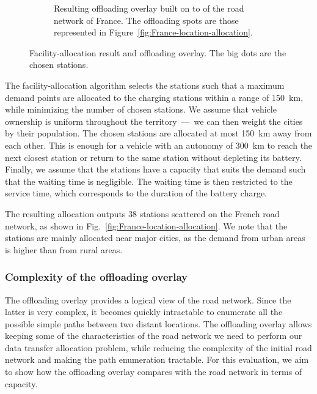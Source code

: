 \begin{figure}[ht]
\begin{subfigure}[t]{0.47\columnwidth}
            \caption{Resulting offloading overlay built on to of the road network of France. The offloading spots are those represented in Figure~\ref{fig:France-location-allocation}.}
            \label{fig:France-overlay-wo-capacity}
    \end{subfigure}
    \caption{Facility-allocation result and offloading overlay. The big dots are the chosen stations.}
\end{figure}

The facility-allocation algorithm selects the stations such that a maximum demand points are allocated to the charging stations within a range of 150~km, while minimizing the number of chosen stations. We assume that vehicle ownership is uniform throughout the territory~---~we can then weight the cities by their population. The chosen stations are allocated at most 150~km away from each other. This is enough for a vehicle with an autonomy of 300~km to reach the next closest station or return to the same station without depleting its battery. Finally, we assume that the stations have a capacity that suits the demand such that the waiting time is negligible. The waiting time is then restricted to the service time, which corresponds to the duration of the battery charge.

The resulting allocation outputs 38 stations scattered on the French road network, as shown in Fig.~\ref{fig:France-location-allocation}. We note that the stations are mainly allocated near major cities, as the demand from urban areas is higher than from rural areas.

\subsubsection{Complexity of the offloading overlay}
\label{sec:complexity-offloading-overlay}

The offloading overlay provides a logical view of the road network. Since the latter is very complex, it becomes quickly intractable to enumerate all the possible simple paths between two distant locations. The offloading overlay allows keeping some of the characteristics of the road network we need to perform our data transfer allocation problem, while reducing the complexity of the initial road network and making the path enumeration tractable. For this evaluation, we aim to show how the offloading overlay compares with the road network in terms of capacity. 

